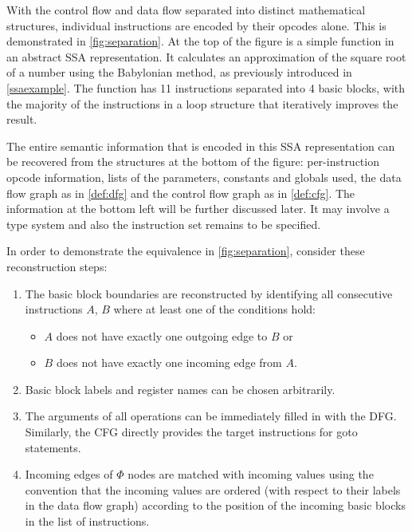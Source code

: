     With the control flow and data flow separated into distinct mathematical
    structures, individual instructions are encoded by their opcodes alone.
    This is demonstrated in \autoref{fig:separation}.
    At the top of the figure is a simple function in an abstract SSA
    representation.
    It calculates an approximation of the square root of a number using the
    Babylonian method, as previously introduced in \autoref{ssaexample}.
    The function has 11 instructions separated into 4 basic blocks, with the
    majority of the instructions in a loop structure that iteratively improves
    the result.

    The entire semantic information that is encoded in this SSA representation
    can be recovered from the structures at the bottom of the figure:
    per-instruction opcode information, lists of the parameters, constants and
    globals used, the data flow graph as in \autoref{def:dfg} and the control
    flow graph as in \autoref{def:cfg}.
    The information at the bottom left will be further discussed later.
    It may involve a type system and also the instruction set remains to be
    specified.

    In order to demonstrate the equivalence in \autoref{fig:separation},
    consider these reconstruction steps:
\begin{enumerate}
    \item The basic block boundaries are reconstructed by identifying all
          consecutive instructions $A$, $B$ where at least one of the
    conditions hold:
    \begin{itemize}
        \item $A$ does not have exactly one outgoing edge to $B$ or
        \item $B$ does not have exactly one incoming edge from $A$.
    \end{itemize}
    \item Basic block labels and register names can be chosen arbitrarily.
    \item The arguments of all operations can be immediately filled in with the 
          DFG. Similarly, the CFG directly provides the target instructions
          for goto statements.
    \item Incoming edges of $\Phi$ nodes are matched with incoming values using
          the convention that the incoming values are ordered (with respect to
          their labels in the data flow graph) according to the position of the
          incoming basic blocks in the list of instructions.
\end{enumerate}

